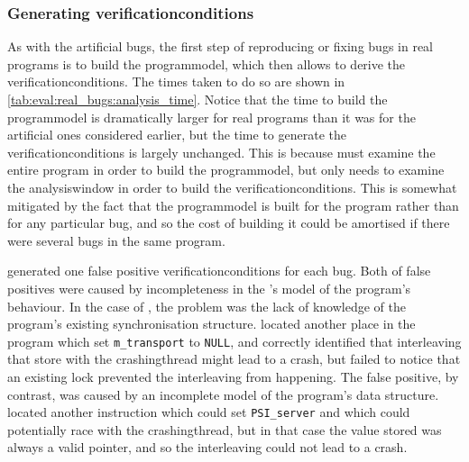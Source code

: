 \subsubsection{Generating \glspl{verificationcondition}}

As with the artificial bugs, the first step of reproducing or fixing
bugs in real programs is to build the \gls{programmodel}, which then
allows {\technique} to derive the \glspl{verificationcondition}.  The
times taken to do so are shown in
\autoref{tab:eval:real_bugs:analysis_time}.  Notice that the time to
build the \gls{programmodel} is dramatically larger for real programs
than it was for the artificial ones considered earlier, but the time
to generate the \glspl{verificationcondition} is largely unchanged.
This is because {\technique} must examine the entire program in order
to build the \gls{programmodel}, but only needs to examine the
\gls{analysiswindow} in order to build the
\glspl{verificationcondition}.  This is somewhat mitigated by the fact
that the \gls{programmodel} is built for the program rather than for
any particular bug, and so the cost of building it could be amortised
if there were several bugs in the same program.


{\Technique} generated one false positive
\glspl{verificationcondition} for each bug.  Both of false positives
were caused by incompleteness in the {\technique}'s model of the
program's behaviour.  In the case of , the
problem was the lack of knowledge of the program's existing
synchronisation structure.  {\Technique} located another place in the
program which set \texttt{m\_transport} to \texttt{NULL}, and
correctly identified that interleaving that store with the
\gls{crashingthread} might lead to a crash, but failed to notice that
an existing lock prevented the interleaving from happening.  The
 false positive, by contrast, was caused by an
incomplete model of the program's data structure.  {\Technique}
located another instruction which could set \texttt{PSI\_server} and
which could potentially race with the \gls{crashingthread}, but in
that case the value stored was always a valid pointer, and so the
interleaving could not lead to a crash.

